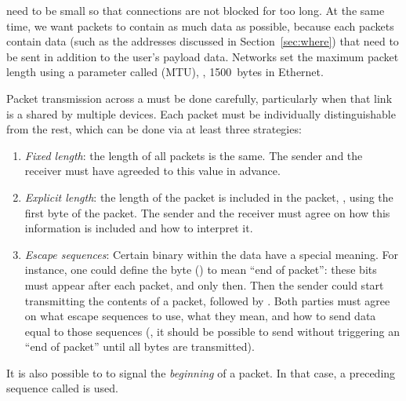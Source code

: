  need to be small so that connections are not blocked for too long. 
At the same time, we want packets to contain as much data as possible, because each packets 
contain  data (such as the addresses discussed in Section~\ref{sec:where}) that need
to be sent in addition to the user's payload data. Networks set the maximum packet length
using a parameter called  (MTU), \eg, 1500~bytes in Ethernet.


Packet transmission across a  must be done carefully,
particularly when that link is a  shared by multiple devices.
Each packet must be individually distinguishable from the rest, 
which can be done via at least three strategies:
\begin{enumerate}
\item \textit{Fixed length}: the length of all packets is the same. The sender and the receiver must have
agreeded to this value in advance.

\item \textit{Explicit length}: the length of the packet is included in the packet, \eg, 
using the first byte of the packet. The sender and the receiver must agree on how this information
is included and how to interpret it.

\item \textit{Escape sequences}: Certain binary  
within the data have a special meaning. 
For instance, one could define the byte  () 
to mean ``end of packet'': these bits must appear after each packet, and only then.
% 
Then the sender could start transmitting the contents of a packet, followed by .
Both parties must agree on what escape sequences to use, what they mean, and how to 
send data equal to those sequences (\eg, it should be possible to send 
without triggering an ``end of packet'' until all bytes are transmitted).
\end{enumerate}

\begin{remark}
It is also possible to to signal the \textit{beginning} of a packet. In that case, a preceding sequence called  is used.
\end{remark}


